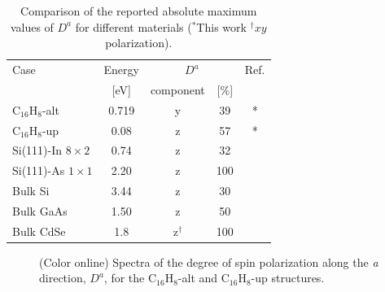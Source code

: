 \documentclass[pss]{wiley2sp} %
\begin{document}
\begin{table}[b]
  \sidecaption
  \begin{tabular}{lcccc}
  \hline
  Case & Energy &  \multicolumn{2}{c}{$D^{a}$} &  Ref.\\
  \cline{3-4}
  & [eV]   & component & [\%] \\
  \hline
  C$_{16}$H$_{8}$-alt  & 0.719& y & 39     & * \\
  C$_{16}$H$_{8}$-up   & 0.08 & z & 57     & * \\
  Si(111)-In $8\times2$& 0.74 & z & 32     & \cite{arzatePRB14}  \\
  Si(111)-As $1\times1$& 2.20 & z & 100    & \cite{mendozaPRB12} \\
  Bulk Si              & 3.44 & z & 30     & \cite{nastosPRB07}     \\
  Bulk GaAs            & 1.50 & z & 50     & \cite{nastosPRB07,bhatPRB05} \\
  Bulk CdSe            & 1.8  & z$^{\dag}$ & 100& \cite{nastosPRB07}\\
  \hline
  \end{tabular}
  \caption[]{%
  Comparison of the reported absolute maximum values of {$D^{a}$} for different materials ($^{*}$This work $^{\dag}xy$ polarization).}
  \label{tab:dacomp}
\end{table}

\begin{figure}[t]
\hfill
{}
\caption{(Color online) Spectra of the degree of spin polarization along the
\emph{a} direction, {$D^{a}$}, for the C$_{16}$H$_{8}$-alt and
C$_{16}$H$_{8}$-up structures.\label{fig:Da}}
\end{figure}
\end{document}
